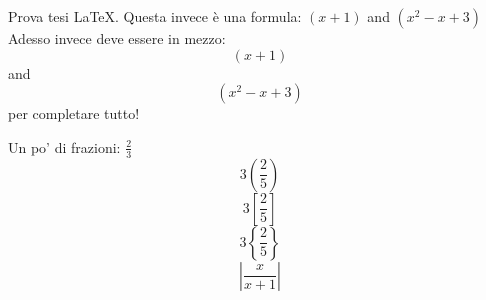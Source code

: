 \documentclass[11pt]{article}
\begin{document}
Prova tesi LaTeX.
Questa invece è una formula: $(x + 1)$ and $(x^2 - x + 3)$\\
Adesso invece deve essere in mezzo: $$(x + 1)$$ and $$(x^2 - x + 3)$$ per completare tutto!
\par\null\par
Un po' di frazioni:
$\displaystyle{\frac{2}{3}}$
$$3\left(\frac{2}{5}\right)$$
$$3\left[\frac{2}{5}\right]$$
$$3\left\{\frac{2}{5}\right\}$$
$$\left|\frac{x}{x+1}\right|$$
\end{document}
